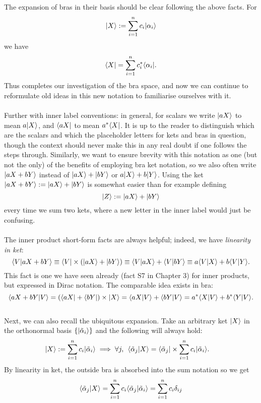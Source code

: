 \\\\
The expansion of bras in their basis should be clear following the above facts. For 
$$
|X\rangle:=\sum_{i=1}^{n}c_{i}|\alpha_{i}\rangle
$$
we have 
$$
\langle X|=\sum_{i=1}^{n}c_{i}^{\ast}\langle\alpha_{i}|.
$$
Thus completes our investigation of the bra space, and now we can continue to reformulate old ideas in this new notation to familiarise ourselves with it.
\\\\
Further with inner label conventions: in general, for scalars we write
$|aX\rangle$ to mean $a|X\rangle$, and $\langle aX|$ to mean $a^{\ast}\langle X|$. It is up to the reader to distinguish which are the scalars and which the placeholder letters for kets and bras in question, though the context should never make this in any real doubt if one follows the steps through. Similarly, we want to ensure brevity with this notation as one (but not the only) of the benefits of employing bra ket notation, so we also often write $|aX+bY\rangle$ instead of $|aX\rangle+|bY\rangle$ or $a|X\rangle+b|Y\rangle$. Using the ket $|aX+bY\rangle:=|aX\rangle+|bY\rangle$ is somewhat easier than for example defining
$$
|Z\rangle:=|aX\rangle+|bY\rangle
$$ 
every time we sum two kets, where a new letter in the inner label would just be confusing.
\\\\
The inner product short-form facts are always helpful; indeed, we have \textit{linearity in ket}:
$$
\langle V|aX+bY\rangle\equiv\langle V|\times(|aX\rangle+|bY\rangle)\equiv\langle V|aX\rangle+\langle V|bY\rangle\equiv a\langle V|X\rangle+b\langle V|Y\rangle.
$$
This fact is one we have seen already (fact S7 in Chapter 3) for inner products, but expressed in Dirac notation. The comparable idea exists in bra:
$$
\langle aX+bY|V\rangle=(\langle aX|+\langle bY|)\times|X\rangle=\langle aX|V\rangle+\langle bY|V\rangle=a^{\ast}\langle X|V\rangle+b^{\ast}\langle Y|V\rangle.
$$
\\
Next, we can also recall the ubiquitous expansion. Take an arbitrary ket $|X\rangle$ in the orthonormal basis $\{|\tilde{\alpha}_{i}\rangle\}$ and the following will always hold: 
$$
\begin{aligned}
|X\rangle&:=\sum_{i=1}^{n}c_{i}|\tilde{\alpha}_{i}\rangle \implies \forall j, \:\: \langle\tilde{\alpha}_{j}|X\rangle=\langle\tilde{\alpha}_{j}|\times\sum_{i=1}^{n}c_{i}|\tilde{\alpha}_{i}\rangle.
&
\end{aligned}
$$
By linearity in ket, the outside bra is absorbed into the sum notation so we get
$$
\langle\tilde{\alpha}_{j}|X\rangle=\sum_{i=1}^{n}c_{i}\langle\tilde{\alpha}_{j}|\tilde{\alpha}_{i}\rangle=\sum_{i=1}^{n}c_{i}\delta_{ij}
$$
